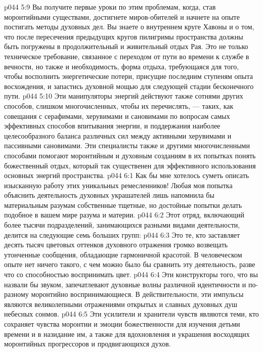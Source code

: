 \vs p044 5:9 Вы получите первые уроки по этим проблемам, когда, став моронтийными существами, достигнете миров\hyp{}обителей и начнете на опыте постигать методы духовных дел. Вы знаете о внутреннем круге Хавоны и о том, что после пересечения предыдущих кругов пилигримы пространства должны быть погружены в продолжительный и живительный отдых Рая. Это не только техническое требование, связанное с переходом от пути во времени к службе в вечности, но также и необходимость, форма отдыха, требующаяся для того, чтобы восполнить энергетические потери, присущие последним ступеням опыта восхождения, и запастись духовной мощью для следующей стадии бесконечного пути.
\vs p044 5:10 Эти манипуляторы энергий действуют также сотнями других способов, слишком многочисленных, чтобы их перечислять, --- таких, как совещания с серафимами, херувимами и сановимами по вопросам самых эффективных способов впитывания энергии, и поддержания наиболее целесообразного баланса различных сил между активными херувимами и пассивными сановимами. Эти специалисты также и другими многочисленными способами помогают моронтийным и духовным созданиям в их попытках понять божественный отдых, который так существенен для эффективного использования основных энергий пространства.
\vs p044 6:1 Как бы мне хотелось суметь описать изысканную работу этих уникальных ремесленников! Любая моя попытка объяснить деятельность духовных украшателей лишь напомнила бы материальным разумам собственные тщетные, но достойные попытки делать подобное в вашем мире разума и материи.
\vs p044 6:2 Этот отряд, включающий более тысячи подразделений, занимающихся разными видами деятельности, делится на следующие семь больших групп:
\vs p044 6:3 \bibnobreakspace {} Это те, кто заставляет десять тысяч цветовых оттенков духовного отражения громко возвещать утонченные сообщения, обладающие гармоничной красотой. В человеческом опыте нет ничего такого, с чем можно было бы сравнить эту деятельность, разве что со способностью воспринимать цвет.
\vs p044 6:4 \pc {}\bibnobreakspace {} Эти конструкторы того, что вы назвали бы звуком, запечатлевают духовные волны различной идентичности и по\hyp{}разному моронтийно воспринимающиеся. В действительности, эти импульсы являются великолепными отражениями открытых и славных духовных душ небесных сонмов.
\vs p044 6:5 \pc {}\bibnobreakspace {} Эти усилители и хранители чувств являются теми, кто сохраняет чувства моронтии и эмоции божественности для изучения детьми времени и в назидание им, а также для вдохновления и украшения восходящих моронтийных прогрессоров и продвигающихся духов.
